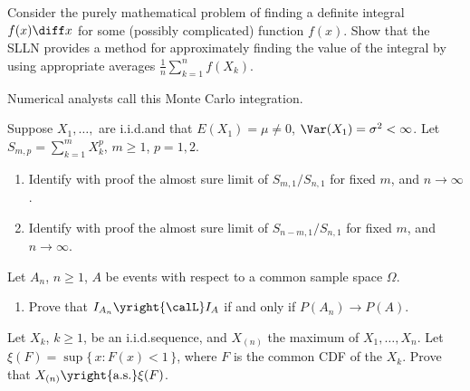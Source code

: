 \begin{problem}
  Consider the purely mathematical problem of finding a definite integral
  \(f(x)\diff x\) for some (possibly complicated) function \(f(x)\). Show
  that the SLLN provides a method for approximately finding the value of
  the integral by using appropriate averages
  \(\frac{1}{n}\sum_{k=1}^n f(X_k)\).

  Numerical analysts call this Monte Carlo integration.
\end{problem}
\begin{solution}

\end{solution}
\newpage

\begin{problem}[DasGupta 7.4 (a), (b)]
  Suppose \(X_1,\dotsc,\) are i.i.d.\@ and that \(E(X_1)=\mu\neq 0\),
  \(\Var(X_1)=\sigma^2<\infty\). Let \(S_{m,p}=\sum_{k=1}^m X_k^p\),
  \(m\geq 1\), \(p=1,2\).
  \begin{enumerate}[label=(\alph*),noitemsep]
  \item Identify with proof the almost sure limit of \(S_{m,1}/S_{n,1}\)
    for fixed \(m\), and \(n\to\infty\).
  \item Identify with proof the almost sure limit of \(S_{n-m,1}/S_{n,1}\)
    for fixed \(m\), and \(n\to\infty\).
  \end{enumerate}
\end{problem}
\begin{solution}

\end{solution}
\newpage

\begin{problem}[DasGupta 7.5 (a)]
  Let \(A_n\), \(n\geq 1\), \(A\) be events with respect to a common sample
  space \(\Omega\).
  \begin{enumerate}[label=(\alph*),noitemsep]
  \item Prove that \(I_{A_n}\yright{\calL} I_A\) if and only if \(P(A_n)\to
    P(A)\).
  \end{enumerate}
\end{problem}
\begin{solution}

\end{solution}
\newpage

\begin{problem}
  Let \(X_k\), \(k\geq 1\), be an i.i.d.\@ sequence, and \(X_{(n)}\) the
  maximum of \(X_1,\dotsc,X_n\). Let \(\xi(F)=\sup\{\,x:F(x)<1\,\}\), where
  \(F\) is the common CDF of the \(X_k\). Prove that
  \(X_{(n)}\yright{\text{a.s.}}\xi(F)\).
\end{problem}
\begin{solution}

\end{solution}
\newpage

